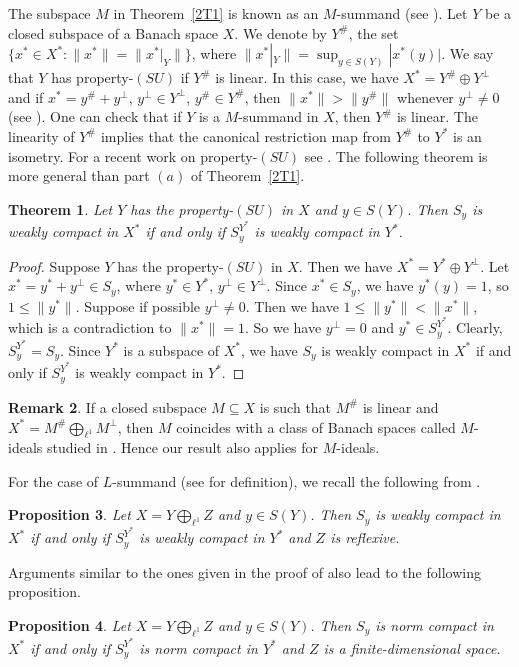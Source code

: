 \documentclass[12pt]{amsart}
\newtheorem{theorem}{Theorem}[section]
\newtheorem{proposition}[theorem]{Proposition}
\theoremstyle{definition}
\newtheorem{remark}[theorem]{Remark}
\numberwithin{equation}{section}
\begin{document}
The subspace $M$ in Theorem~\ref{2T1} is known as an $M$-summand (see \cite[Definition~I.1.1]{HWW}). Let $Y$ be a closed subspace of a Banach space $X$. We denote by $Y^\#$, the set $\{x^*\in X^*:\|x^*\|=\|x^*|_Y\|\}$, where $\|x^*|_Y\|=\sup_{y\in S(Y)}|x^*(y)|$. We say that $Y$ has property-$(SU)$ if $Y^\#$ is linear. In this case, we have $X^*=Y^\#\oplus Y^\perp$ and if $x^*=y^{\#}+y^\perp$, $y^\perp\in Y^\perp$, $y^\#\in Y^{\#}$, then $\|x^*\|>\|y^{\#}\|$ whenever $y^\perp \neq 0$ (see \cite{O}). One can check that if $Y$ is a $M$-summand in $X$, then $Y^\#$ is linear. The linearity of $Y^\#$ implies that the canonical restriction map from $Y^{\#}$ to $Y^*$ is an isometry. For a recent work on property-$(SU)$ see \cite{DPR}. The following theorem is more general than part $(a)$ of Theorem~\ref{2T1}.
\begin{theorem}\label{2T2}
    Let $Y$ has the property-$(SU)$ in $X$ and $y\in S(Y)$. Then $S_y$ is weakly compact in $X^*$ if and only if $S^{Y^*}_y$ is weakly compact in $Y^*$.
\end{theorem}
\begin{proof}
  Suppose $Y$ has the property-$(SU)$ in $X$.  Then we have $X^*=Y^*\oplus Y^{\perp}$. Let $x^*=y^*+y^{\perp}\in S_y$, where $y^*\in Y^*$, $y^{\perp}\in Y^{\perp}$. Since $x^*\in S^{}_y$, we have $y^*(y)=1$, so $1\leq\|y^*\|$. Suppose if possible $y^{\perp}\neq 0$. Then we have $1\leq\|y^*\|<\|x^*\|$, which is a contradiction to $\|x^*\|=1$. So we have $y^{\perp}=0$ and $y^*\in S^{Y^*}_y$. Clearly, $S^{Y^*}_y=S_{y}$. Since $Y^*$ is a subspace of $X^*$, we have $S_{y}$ is weakly compact in $X^*$ if and only if $S^{Y^*}_{y}$ is weakly compact in $Y^*$.
\end{proof}
\begin{remark}
If a closed subspace $M\subseteq X$ is such that $M^{\#}$ is linear and $X^*=M^{\#}\bigoplus_{\ell^1}M^{\perp}$, then $M$ coincides with a class of Banach spaces called $M$-ideals studied in \cite{HWW}. Hence our result also applies for $M$-ideals.
\end{remark}

For the case of $L$-summand (see \cite{HWW} for definition),  we recall the following from \cite{R1}.

\begin{proposition}\label{2P4}\cite[Proposition~4]{R1}
    Let $X=Y\bigoplus_{\ell^1} Z$ and $y\in S(Y)$. Then $S_y$ is weakly compact in $X^*$ if and only if $S^{Y^*}_y$ is weakly compact in $Y^*$ and $Z$ is reflexive.
\end{proposition}
Arguments similar to the ones given in the proof of \cite[Proposition~4]{R1} also lead to the following proposition.
\begin{proposition}\label{2P5}
    Let $X=Y\bigoplus_{\ell^1} Z$ and $y\in S(Y)$. Then $S_y$ is norm  compact in $X^*$ if and only if $S^{Y^*}_y$ is norm compact in $Y^*$ and $Z$ is a finite-dimensional space.
\end{proposition}
\end{document}
